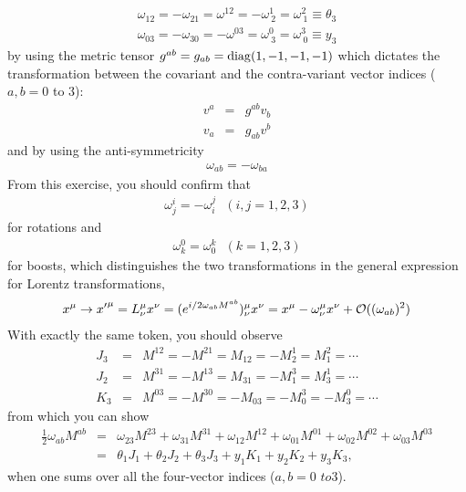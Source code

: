 \documentclass[12pt]{article}
\begin{document}
\begin{eqnarray}
\omega_{12}  
= -\omega_{21}
=  \omega^{12}
= -\omega^1_{~2}
=  \omega^2_{~1} \equiv  \theta_3 \label{eq.11defthet3} 
\end{eqnarray}
\begin{eqnarray}
 \omega_{03}     
  = -\omega_{30}
  = -\omega^{03}
  =  \omega^0_{~3}
  =  \omega^3_{~0}
  \equiv   y_3 \label{eq.11defy3}
\end{eqnarray}
by using the metric tensor $g^{ab} = g_{ab} = {\rm diag}(1,-1,-1,-1)$ which
  dictates the transformation between the covariant and the
  contra-variant vector indices ($a,b = 0$ to $3$):
\begin{eqnarray}
 v^a &=& g^{ab} v_b \label{eq.11vatran1}\\
 v_a &=& g_{ab} v^b \label{eq.11vatran2}
\end{eqnarray}
  and by using the anti-symmetricity
\begin{eqnarray}
  \omega_{ab} = -\omega_{ba} \label{eq.11omegaanti}
\end{eqnarray}
   From this exercise, you should confirm that
\begin{eqnarray}
  \omega^i_j = -\omega^j_i~~~   (i,j=1,2,3)
\end{eqnarray}
  for rotations and
\begin{eqnarray}
  \omega^0_k = \omega^k_0  ~~~ (k=1,2,3)
\end{eqnarray}
  for boosts, which distinguishes the two transformations in the general
  expression for Lorentz transformations,
\begin{eqnarray}
  x^\mu \to {x'}^\mu = L^\mu_\nu x^\nu
  = (e^{ i/2 \omega_{ab} M^{ab} })^\mu_\nu x^\nu
  = x^\mu - \omega^\mu_\nu x^\nu + {\cal O}((\omega_{ab})^2)
\end{eqnarray}
  With exactly the same token, you should observe
\begin{eqnarray}
  J_3 &=& M^{12} = -M^{21} = M_{12} = -M^1_2 = M^2_1 = \cdots \\
  J_2 &=& M^{31} = -M^{13} = M_{31} = -M^3_1 = M^1_3 = \cdots \\
  K_3 &=& M^{03} = -M^{30} = -M_{03} = -M^3_0 = -M^0_3 = \cdots
\end{eqnarray}
  from which you can show
\begin{eqnarray}
  \frac{1}{2} \omega_{ab} M^{ab}
  &=& \omega_{23} M^{23} +\omega_{31} M^{31} +\omega_{12} M^{12} +\omega_{01} M^{01} +\omega_{02} M^{02} +\omega_{03} M^{03} \\
  &=& \theta_1 J_1  +\theta_2 J_2  +\theta_3 J_3  +y_1 K_1  +y_2  K_2  +y_3  K_3, 
\end{eqnarray}
when one sums over all the four-vector indices ($a,b = 0$ $to 3$).
\end{document}
